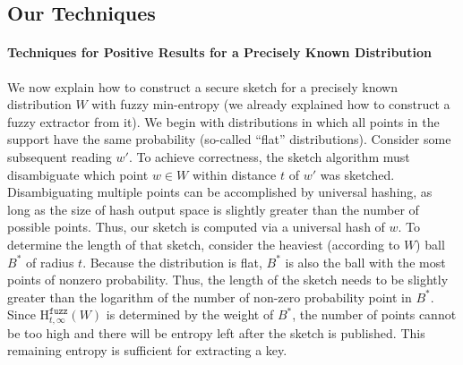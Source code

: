 \documentclass[11pt]{article}
\newcommand{\secref}[1]{\mbox{Section~\ref{#1}}}
\newcommand{\Hfuzz}{\mathrm{H}^{\mathtt{fuzz}}_{t,\infty}}
\begin{document}

\subsection{Our Techniques}

\paragraph{Techniques for Positive Results for a Precisely Known
  Distribution} 
We now explain how to construct a secure sketch for a precisely known
distribution $W$ with fuzzy min-entropy (we already explained how to
construct a fuzzy extractor from it).  We begin with distributions in
which all points in the support have the same probability (so-called
``flat'' distributions).  Consider some subsequent reading $w'$. To
achieve correctness, the sketch algorithm must disambiguate which
point $w\in W$ within distance $t$ of $w'$ was
sketched. Disambiguating multiple points can be accomplished by
universal hashing, as long as the size of hash output space is
slightly greater than the number of possible points. Thus, our sketch
is computed via a universal hash of $w$. To determine the length of
that sketch, consider the heaviest (according to $W$) ball $B^*$ of radius
$t$. Because the distribution is flat, $B^*$ is also the ball with the
most points of nonzero probability. Thus, the length of the sketch
needs to be slightly greater than the logarithm of the number of
non-zero probability point in $B^*$. Since $\Hfuzz(W)$ is
determined by the weight of $B^*$, the number of points cannot be
too high and there will be entropy left after the sketch is published.
%
This remaining entropy is sufficient for extracting a key.
\end{document}
